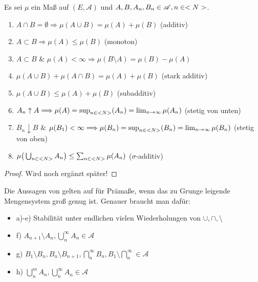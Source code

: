 \begin{proposition}
	Es sei $\mu$ ein Maß auf $(E,\mathscr{A})$ und $A,B,A_n, B_n \in \mathscr{A}, n \in <N>$.
	\begin{enumerate}
		\item $A\cap B = \emptyset \Longrightarrow \mu(A \cup B) = \mu(A) + \mu(B)$ (additiv)
		\item $A\subset B \Longrightarrow \mu(A) \leq \mu(B)$ (monoton)
		\item $A \subset B$ \& $\mu(A) < \infty \Longrightarrow \mu(B\setminus A) = \mu(B) - \mu(A)$
		\item $\mu(A \cup B) + \mu(A\cap B) = \mu(A) + \mu(B)$ (stark additiv)
		\item $\mu(A \cup B) \leq \mu(A) + \mu(B)$ (subadditiv)
		\item $A_n \uparrow A \Longrightarrow \mu(A)  = \sup_{n\in <N>} (A_n) = \lim_{n\to \infty} \mu(A_n)$ (stetig von unten)
		\item $B_n \downarrow B$ \& $\mu(B_1) < \infty \Longrightarrow \mu(B_n)  = \sup_{n\in <N>} (B_n) = \lim_{n\to \infty} \mu(B_n)$ (stetig von oben)
		\item $\mu\big(\bigcup_{n\in <N>} A_n\big) \leq \sum_{n\in <N>} \mu (A_n)$ ($\sigma$-additiv)
	\end{enumerate}
\end{proposition}

\begin{proof}
	Wird noch ergänzt später!
\end{proof}

\begin{remark}
	Die Aussagen von  gelten auf für Prämaße, wenn das zu Grunge leigende Mengensystem groß genug ist. Genauer braucht man dafür:
	\begin{itemize} %
		\item a)-e) Stabilität unter endlichen vielen Wiederholungen von $\cup,\cap,\setminus$
		\item f) $A_{n+1}\setminus A_n,\bigcup_{n}^{\infty} A_n \in \mathscr{A}$
		\item g) $B_1 \setminus B_n,B_n \setminus B_{n+1},\bigcap_{n}^{\infty} B_n,B_1\setminus \bigcap_{n}^{\infty} \in \mathscr{A}$
		\item h) $\bigcup_{n}^{m} A_n,\bigcup_{n}^{\infty} A_n \in \mathscr{A}$
	\end{itemize}
\end{remark}

